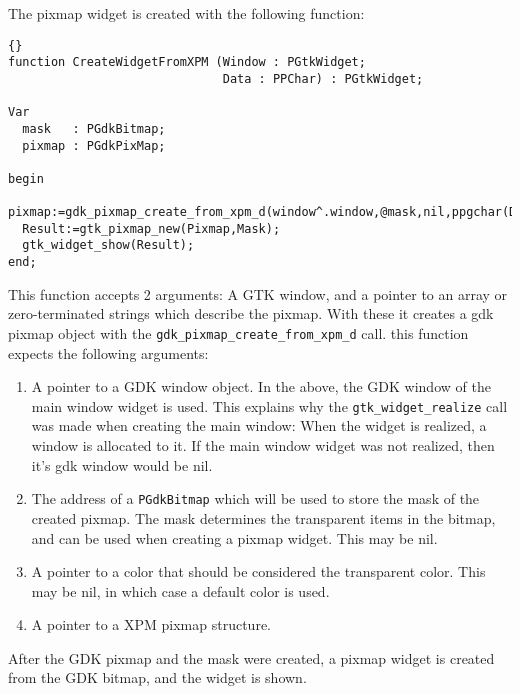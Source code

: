 \documentclass[10pt]{article}
\begin{document}
The pixmap widget is created with the following function:
\begin{lstlisting}{}
function CreateWidgetFromXPM (Window : PGtkWidget; 
                              Data : PPChar) : PGtkWidget;

Var
  mask   : PGdkBitmap;
  pixmap : PGdkPixMap;

begin
  pixmap:=gdk_pixmap_create_from_xpm_d(window^.window,@mask,nil,ppgchar(Data));
  Result:=gtk_pixmap_new(Pixmap,Mask);
  gtk_widget_show(Result);
end;
\end{lstlisting}
This function accepts 2 arguments: A GTK window, and a pointer to an array
or zero-terminated strings which describe the pixmap. With these it creates 
a gdk pixmap object with the \lstinline|gdk_pixmap_create_from_xpm_d| call.
this function expects the following arguments:
\begin{enumerate}
\item A pointer to a GDK window object. In the above, the GDK window of the
main window widget is used. This explains why the \lstinline|gtk_widget_realize|
call was made when creating the main window: When the widget is realized, a
window is allocated to it. If the main window widget was not realized, then
it's gdk window would be nil.
\item The address of a \lstinline|PGdkBitmap| which will be used to store
the mask of the created pixmap. The mask determines the transparent items
in the bitmap, and can be used when creating a pixmap widget. This may be
nil.
\item A pointer to a color that should be considered the transparent
color. This may be nil, in which case a default color is used.
\item A pointer to a XPM pixmap structure. 
\end{enumerate}
After the GDK pixmap and the mask were created, a pixmap widget is created
from the GDK bitmap, and the widget is shown.
\end{document}
